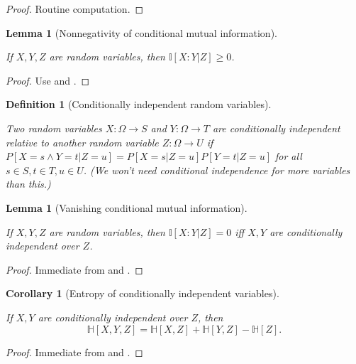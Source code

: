 \documentclass[10pt,a4paper]{article}
\newtheorem{lemma}[theorem]{Lemma}
\newtheorem{corollary}[theorem]{Corollary}
\newtheorem{definition}[theorem]{Definition}
\newcommand{\lean}[1]{}
\newcommand{\uses}[1]{}
\newcommand{\leanok}{}
\newcommand{\bbH}{\mathbb{H}}
\newcommand{\bbI}{\mathbb{I}}
\begin{document}
\begin{proof}\leanok Routine computation.
\end{proof}

\begin{lemma}[Nonnegativity of conditional mutual information]
\label{conditional-nonneg}
\uses{conditional-mutual-def}
\lean{ProbabilityTheory.condMutualInfo_nonneg}\leanok
If $X,Y,Z$ are random variables, then $\bbI[X:Y|Z] \ge 0$.
\end{lemma}
\begin{proof}
\uses{submodularity}
\leanok
Use  and .
\end{proof}

\begin{definition}[Conditionally independent random variables]
\label{conditional-independent-def}
\lean{ProbabilityTheory.CondIndepFun}\leanok
  Two random variables $X: \Omega \to S$ and $Y: \Omega \to T$ are conditionally independent relative to another random variable $Z: \Omega \to U$ if $P[X = s \wedge Y = t| Z=u] = P[X=s|Z=u] P[Y=t|Z=u]$ for all $s \in S, t \in T, u \in U$.  (We won't need conditional independence for more variables than this.)
\end{definition}

\begin{lemma}[Vanishing conditional mutual information]\label{conditional-vanish}
  \lean{ProbabilityTheory.condMutualInfo_eq_zero}
  \leanok
  If $X,Y,Z$ are random variables, then $\bbI[X:Y|Z] = 0$ iff $X,Y$ are conditionally independent over $Z$.
\end{lemma}

\begin{proof} \uses{vanish-entropy, conditional-independent-def}\leanok Immediate from  and .
\end{proof}

\begin{corollary}[Entropy of conditionally independent variables]\label{cond-trial-ent}
  \lean{ProbabilityTheory.ent_of_cond_indep}\leanok
  If $X, Y$ are conditionally independent over $Z$, then
  $$ \bbH[X,Y,Z] =\bbH[X,Z] + \bbH[Y,Z] - \bbH[Z].$$
\end{corollary}

\begin{proof} \uses{conditional-vanish, conditional-mutual-alt}\leanok Immediate from  and .
\end{proof}
\end{document}
